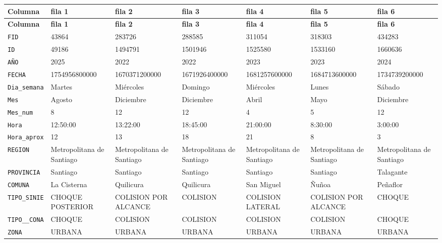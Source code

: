 \documentclass[10pt]{article}
\newcommand{\hdr}[1]{\textbf{\color{white}#1}}
\begin{document}
\footnotesize
\begin{xltabular}{\linewidth}{@{}p{4.3cm} Y Y Y Y Y Y @{}}
\hdr{Columna} & \hdr{fila 1} & \hdr{fila 2} & \hdr{fila 3} & \hdr{fila 4} & \hdr{fila 5} & \hdr{fila 6} \\
\endfirsthead
{}\hdr{Columna} & \hdr{fila 1} & \hdr{fila 2} & \hdr{fila 3} & \hdr{fila 4} & \hdr{fila 5} & \hdr{fila 6} \\
\endhead
{}\texttt{FID} & 43864 & 283726 & 288585 & 311054 & 318303 & 434283 \\
\texttt{ID} & 49186 & 1494791 & 1501946 & 1525580 & 1533160 & 1660636 \\
\texttt{AÑO} & 2025 & 2022 & 2022 & 2023 & 2023 & 2024 \\
\texttt{FECHA} & 1754956800000 & 1670371200000 & 1671926400000 & 1681257600000 & 1684713600000 & 1734739200000 \\
\texttt{Dia\_\allowbreak{}semana} & Martes & Miércoles & Domingo & Miércoles & Lunes & Sábado \\
\texttt{Mes} & Agosto & Diciembre & Diciembre & Abril & Mayo & Diciembre \\
\texttt{Mes\_\allowbreak{}num} & 8 & 12 & 12 & 4 & 5 & 12 \\
\texttt{Hora} & 12:50:00 & 13:22:00 & 18:45:00 & 21:00:00 & 8:30:00 & 3:00:00 \\
\texttt{Hora\_\allowbreak{}aprox} & 12 & 13 & 18 & 21 & 8 & 3 \\
\texttt{REGION} & Metropolitana de Santiago & Metropolitana de Santiago & Metropolitana de Santiago & Metropolitana de Santiago & Metropolitana de Santiago & Metropolitana de Santiago \\
\texttt{PROVINCIA} & Santiago & Santiago & Santiago & Santiago & Santiago & Talagante \\
\texttt{COMUNA} & La Cisterna & Quilicura & Quilicura & San Miguel & Ñuñoa & Peñaflor \\
\texttt{TIPO\_\allowbreak{}SINIE} & CHOQUE POSTERIOR & COLISION POR ALCANCE & COLISION & COLISION LATERAL & COLISION POR ALCANCE & CHOQUE \\
\texttt{TIPO\_\allowbreak{}\_\allowbreak{}CONA} & CHOQUE & COLISION & COLISION & COLISION & COLISION & CHOQUE \\
\texttt{ZONA} & URBANA & URBANA & URBANA & URBANA & URBANA & URBANA \\

\end{xltabular}
\end{document}
